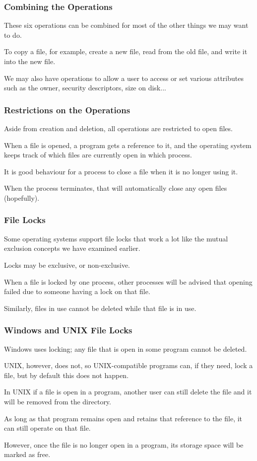 \begin{frame}
\frametitle{Combining the Operations}

These six operations can be combined for most of the other things we may want to do. 

To copy a file, for example, create a new file, read from the old file, and write it into the new file. 

We may also have operations to allow a user to access or set various attributes such as the owner, security descriptors, size on disk...

\end{frame}

\begin{frame}
\frametitle{Restrictions on the Operations}

Aside from creation and deletion, all operations are restricted to open files.

When a file is opened, a program gets a reference to it, and the operating system keeps track of which files are currently open in which process. 

It is good behaviour for a process to close a file when it is no longer using it.

When the process terminates, that will automatically close any open files (hopefully).

\end{frame}

\begin{frame}
\frametitle{File Locks}

Some operating systems support file locks that work a lot like the mutual exclusion concepts we have examined earlier. 

Locks may be exclusive, or non-exclusive. 

When a file is locked by one process, other processes will be advised that opening failed due to someone having a lock on that file. 

Similarly, files in use cannot be deleted while that file is in use. 

\end{frame}

\begin{frame}
\frametitle{Windows and UNIX File Locks}

Windows uses locking; any file that is open in some program cannot be deleted. 

UNIX, however, does not, so UNIX-compatible programs can, if they need, lock a file, but by default this does not happen. 

In UNIX if a file is open in a program, another user can still delete the file and it will be removed from the directory. 

As long as that program remains open and retains that reference to the file, it can still operate on that file. 

However, once the file is no longer open in a program, its storage space will be marked as free.

\end{frame}


